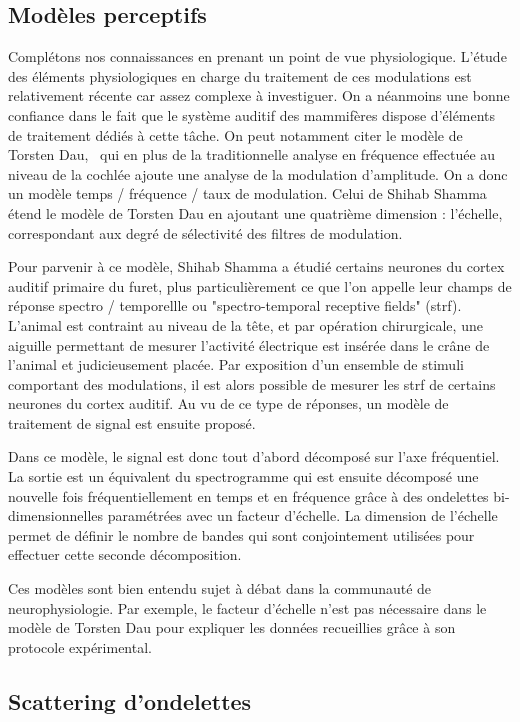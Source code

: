 \subsection{Modèles perceptifs}

Complétons nos connaissances en prenant un point de vue physiologique. L'étude des éléments physiologiques en charge du traitement de ces modulations est relativement récente car assez complexe à investiguer. On a néanmoins une bonne confiance dans le fait que le système auditif des mammifères dispose d'éléments de traitement dédiés à cette tâche. On peut notamment citer le modèle de Torsten Dau,~\cite{dau1997modeling} qui en plus de la traditionnelle analyse en fréquence effectuée au niveau de la cochlée ajoute une analyse de la modulation d'amplitude. On a donc un modèle temps / fréquence / taux de modulation. Celui de Shihab Shamma~\cite{fritz2003rapid} étend le modèle de Torsten Dau en ajoutant une quatrième dimension : l'échelle, correspondant aux degré de sélectivité des filtres de modulation.

Pour parvenir à ce modèle, Shihab Shamma a étudié certains neurones du cortex auditif primaire du furet, plus particulièrement ce que l'on appelle leur champs de réponse spectro / temporellle ou "spectro-temporal receptive fields" (strf). L'animal est contraint au niveau de la tête, et par opération chirurgicale, une aiguille permettant de mesurer l'activité électrique est insérée dans le crâne de l'animal et judicieusement placée. Par exposition d'un ensemble de stimuli comportant des modulations, il est alors possible de mesurer les strf de certains neurones du cortex auditif. Au vu de ce type de réponses, un modèle de traitement de signal est ensuite proposé.

Dans ce modèle, le signal est donc tout d'abord décomposé sur l'axe fréquentiel. La sortie est un équivalent du spectrogramme qui est ensuite décomposé une nouvelle fois fréquentiellement en temps et en fréquence grâce à des ondelettes bi-dimensionnelles paramétrées avec un facteur d'échelle. La dimension de l'échelle permet de définir le nombre de bandes qui sont conjointement utilisées pour effectuer cette seconde décomposition.

Ces modèles sont bien entendu sujet à débat dans la communauté de neurophysiologie. Par exemple, le facteur d'échelle n'est pas nécessaire dans le modèle de Torsten Dau pour expliquer les données recueillies grâce à son protocole expérimental.

\subsection{\nmu Scattering d'ondelettes}  \label{sec:scattering}

